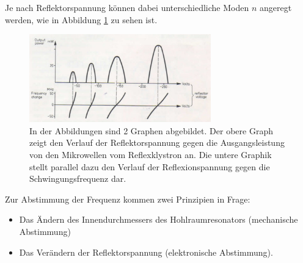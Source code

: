             Je nach Reflektorspannung können dabei unterschiedliche Moden $n$ angeregt werden, wie in Abbildung \ref{fig:2} zu sehen ist.
            \begin{figure}[H]
                \centering
                \includegraphics[width=0.7\textwidth]{pics/voltage_graphic.jpg}
                \caption{
                    In der Abbildungen sind 2 Graphen abgebildet. Der obere 
                    Graph zeigt den Verlauf der Reflektorspannung gegen die Ausgangsleistung von den
                    Mikrowellen vom Reflexklystron an. Die untere Graphik stellt parallel dazu
                    den Verlauf der Reflexionspannung gegen die Schwingungsfrequenz dar.\cite{Mikro}
                }
                \label{fig:2}
            \end{figure}
            Zur Abstimmung der Frequenz kommen zwei Prinzipien in Frage: 
            \begin{itemize}
               \item Das Ändern des Innendurchmessers des Hohlraumresonators (mechanische Abstimmung) 
               \item Das Verändern der Reflektorspannung (elektronische Abstimmung).
            \end{itemize}
